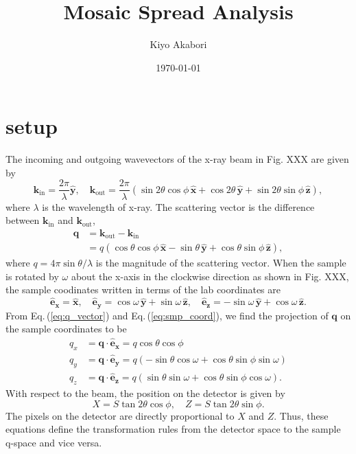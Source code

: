 \documentclass[12pt,letterpaper]{article}
\author{Kiyo Akabori}
\title{Mosaic Spread Analysis}
\date{\today}
\newcommand{\Eq}[1]{Eq.\,(\ref{#1})} %
\newcommand{\xhat}{\mathbf{\hat{x}}}
\newcommand{\yhat}{\mathbf{\hat{y}}}
\newcommand{\zhat}{\mathbf{\hat{z}}}
\newcommand{\kin}{\mathbf{k}_{\mathrm{in}}}
\newcommand{\kout}{\mathbf{k}_{\mathrm{out}}}
\newcommand{\+}{^{\dagger}}%
\begin{document}

\section{setup}
The incoming and outgoing wavevectors of the x-ray beam in Fig. XXX 
are given by
\begin{equation}
  \kin = \frac{2\pi}{\lambda} \yhat, \quad
  \kout = 
    \frac{2\pi}{\lambda} \left( 
      \sin 2\theta \cos\phi \, \xhat
      + \cos 2\theta \, \yhat
      + \sin 2\theta \sin\phi \, \zhat 
    \right),
  \label{eq:kinkout}
\end{equation}
where $\lambda$ is the wavelength of x-ray. The scattering vector is
the difference between $\kin$ and $\kout$,
\begin{align}
  \mathbf{q} &= \kout - \kin \nonumber \\
             &= q \left( 
                  \cos\theta\cos\phi \, \xhat - \sin\theta \, \yhat
                  + \cos\theta\sin\phi \, \zhat
                \right),
  \label{eq:q_vector}
\end{align}
where $q=4\pi\sin\theta/\lambda$ is the magnitude of the scattering vector. 
When the sample is rotated by $\omega$ about the x-axis in the clockwise 
direction as shown in Fig. XXX, the sample coodinates written in terms of 
the lab coordinates are  
\begin{equation}
  \mathbf{\hat{e}_x} = \xhat, \quad
  \mathbf{\hat{e}_y} = \cos\omega\,\yhat + \sin\omega\,\zhat, \quad
  \mathbf{\hat{e}_z} = -\sin\omega\,\yhat + \cos\omega\,\zhat.
  \label{eq:smp_coord}
\end{equation}
From \Eq{eq:q_vector} and \Eq{eq:smp_coord}, we find the projection of 
$\mathbf{q}$ on the sample coordinates to be
\begin{align}
  q_x &= \mathbf{q}\cdot\mathbf{\hat{e}_x} 
       = q\cos\theta\cos\phi 
       \label{eq:qx} \\
  q_y &= \mathbf{q}\cdot\mathbf{\hat{e}_y} 
       = q\left(-\sin\theta\cos\omega + \cos\theta\sin\phi\sin\omega\right) 
       \label{eq:qy} \\
  q_z &= \mathbf{q}\cdot\mathbf{\hat{e}_z} 
       = q\left(\sin\theta\sin\omega + \cos\theta\sin\phi\cos\omega\right).
       \label{eq:qz}
\end{align}
With respect to the beam, the position on the detector is given by
\begin{equation}
  X = S \tan 2\theta \cos\phi, \quad Z = S \tan 2\theta \sin\phi.
\end{equation} 
The pixels on the detector are directly proportional to $X$ and $Z$. Thus,
these equations define the transformation rules from the detector space
to the sample q-space and vice versa.
\end{document}
